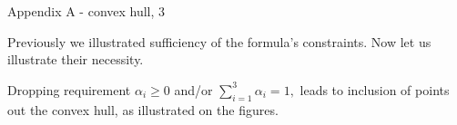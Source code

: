 \documentclass{beamer}
\begin{document}
\begin{frame}{Appendix A - convex hull, 3}
	\begin{flushleft}
		
		
					\begin{figure}
							\begin{subfigure}{.5\textwidth}
									\centering
									\resizebox{.95\textwidth}{!}
									{}
								\end{subfigure}%
							\begin{subfigure}{.5\textwidth}
									\centering
									\resizebox{.95\textwidth}{!}
									{}
								\end{subfigure}
						\end{figure}
		
		Previously we illustrated sufficiency of the formula's constraints. Now let us illustrate their necessity.
		
		\bigskip
		
		Dropping requirement $\alpha_i \geq 0$ and/or $\sum\limits_{i=1}^{3} \alpha_i = 1,$ leads to inclusion of points out the convex hull, as illustrated on the figures.
		
		
	\end{flushleft}
\end{frame}
\end{document}
